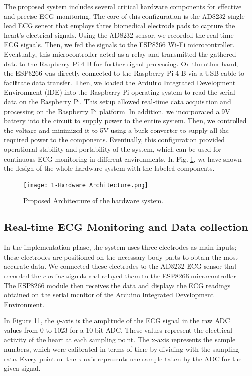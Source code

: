 \documentclass[conference]{IEEEtran}
\begin{document}
The proposed system includes several critical hardware components for effective and precise ECG monitoring. The core of this configuration is the AD8232 single-lead ECG sensor that employs three biomedical electrode pads to capture the heart's electrical signals. Using the AD8232 sensor, we recorded the real-time ECG signals. Then, we fed the signals to the ESP8266 Wi-Fi microcontroller. Eventually, this microcontroller acted as a relay and transmitted the gathered data to the Raspberry Pi 4 B for further signal processing.
On the other hand, the ESP8266 was directly connected to the Raspberry Pi 4 B via a USB cable to facilitate data transfer. Then, we loaded the Arduino Integrated Development Environment (IDE) into the Raspberry Pi operating system to read the serial data on the Raspberry Pi. This setup allowed real-time data acquisition and processing on the Raspberry Pi platform.
In addition, we incorporated a 9V battery into the circuit to supply power to the entire system. Then, we controlled the voltage and minimized it to 5V using a buck converter to supply all the required power to the components. Eventually, this configuration provided operational stability and portability of the system, which can be used for continuous ECG monitoring in different environments. In Fig. \ref{fig-1:Hardware architecture}, we have shown the design of the whole hardware system with the labeled components.

\begin{figure}[htbp]
\centerline{\texttt{[image: 1-Hardware Architecture.png]}}
\caption{Proposed Architecture of the hardware system.}
\label{fig-1:Hardware architecture}
\end{figure}


\subsection{Real-time ECG Monitoring and Data collection}

In the implementation phase, the system uses three electrodes as main inputs; these electrodes are positioned on the necessary body parts to obtain the most accurate data. We connected these electrodes to the AD8232 ECG sensor that recorded the cardiac signals and relayed them to the ESP8266 microcontroller. The ESP8266 module then receives the data and displays the ECG readings obtained on the serial monitor of the Arduino Integrated Development Environment.

In Figure 11, the $y$-axis is the amplitude of the ECG signal in the raw ADC values from 0 to 1023 for a 10-bit ADC. These values represent the electrical activity of the heart at each sampling point. The x-axis represents the sample numbers, which were calibrated in terms of time by dividing with the sampling rate. Every point on the x-axis represents one sample taken by the ADC for the given signal.
\end{document}
